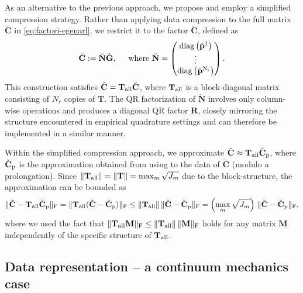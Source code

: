 \documentclass[onefignum,onetabnum]{siamart251104}
\newcommand{\bv}[1]{{\mathbf #1}}
\newcommand{\bt}[1]{{\mathbf{#1}}}
\newcommand{\prol}[1]{{{#1}_{\rm{p}}}} %
\newcommand{\Nr}{{N_r}}
\newcommand{\tAlg}{{\bv{p}}}
\newcommand{\Cp}{{\bt{C}}}
\newcommand{\mydiag}{\rm{diag}}
\begin{document}
As an alternative to the previous approach, we propose and employ a simplified compression strategy. Rather than applying data compression to the full matrix $\tilde{\Cp}$ in \eqref{eq:factori-egenarl}, we restrict it to the factor $\breve{\Cp}$, defined as
{\small
\begin{align} \label{eq:factori-simple-egenarl}
\breve{\Cp} := \breve{\bt{N}} \hat{\bt{G}}, \hspace{0.5cm} \text{where } \breve{\bt{N}} = \begin{pmatrix}
	\mydiag\left(\hat\tAlg^1\right) \\
	\vdots \\
	\mydiag\left(\hat\tAlg^{\Nr}\right)
\end{pmatrix}.
\end{align}
}%
This construction satisfies $\tilde{\Cp} = \bt{T}_{\rm all}\breve{\Cp}$, where $\bt{T}_{\rm all}$ is a block-diagonal matrix consisting of $\Nr$ copies of $\bt{T}$.
The QR factorization of $\breve{\bt{N}}$ involves only column-wise operations and produces a diagonal QR factor $\bt{R}$, closely mirroring the structure encountered in empirical quadrature settings and can therefore be implemented in a similar manner.

\begin{rmrk}
Within the simplified compression approach, we approximate $\tilde{\Cp} \approx \bt{T}_{\rm{all}} \prol{\breve{\Cp}}$, where $\prol{\breve{\Cp}}$ is the approximation obtained from using  to the data of $\breve{\Cp}$ (modulo a prolongation). Since $\|\bt{T}_{\rm{all}}\| =\|\bt{T}\| = \max_{m} \sqrt{J_m}$ due to the block-structure, the approximation can be bounded as
{\small
\begin{align*}
\| \tilde{\Cp} - \bt{T}_{\rm{all}} \prol{\breve{\Cp}} \|_{\rm{F}} = \| \bt{T}_{\rm{all}} ({\breve{\Cp}} - \prol{\breve{\Cp}}) \|_{\rm{F}} \leq 
 \|\bt{T}_{\rm{all}}\| \, \|\breve{\Cp} - \prol{\breve{\Cp}} \|_{\rm{F}} = \left(\max_{m} \sqrt{J_m} \right)\, \|\breve{\Cp} - \prol{\breve{\Cp}} \|_{\rm{F}},
\end{align*}
}%
where we used the fact that  $\| \bt{T}_{\rm{all}} \bt{M} \|_{\rm{F}} \leq 
 \|\bt{T}_{\rm{all}}\| \, \| \bt{M} \|_{\rm{F}}$ holds for any matrix $\bt{M}$ independently of the specific structure of $\bt{T}_{\rm{all}}$.
\end{rmrk}




%
\subsection{Data representation -- a continuum mechanics case}
\label{subsec:separatedData-tensorval}
\end{document}
